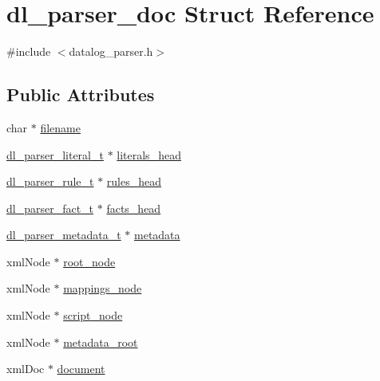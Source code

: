 \hypertarget{structdl__parser__doc}{}\section{dl\+\_\+parser\+\_\+doc Struct Reference}
\label{structdl__parser__doc}


{\ttfamily \#include $<$datalog\+\_\+parser.\+h$>$}

\subsection*{Public Attributes}
\begin{DoxyCompactItemize}
\item 
char $\ast$ \hyperlink{structdl__parser__doc_a723ad524e546b52a5b73a4bb6ea43f53}{filename}
\item 
\hyperlink{datalog__parser_8h_adaef2eede58b9f7698925f7194af1373}{dl\+\_\+parser\+\_\+literal\+\_\+t} $\ast$ \hyperlink{structdl__parser__doc_a85697af981ba61663c7c8e322f596de9}{literals\+\_\+head}
\item 
\hyperlink{datalog__parser_8h_a8024697b9e41c6c143acefaaf5d047cd}{dl\+\_\+parser\+\_\+rule\+\_\+t} $\ast$ \hyperlink{structdl__parser__doc_a46ff67ec42f4b114c00fc804296bf1aa}{rules\+\_\+head}
\item 
\hyperlink{datalog__parser_8h_ad97776994371341952d410f045d73e72}{dl\+\_\+parser\+\_\+fact\+\_\+t} $\ast$ \hyperlink{structdl__parser__doc_a6461d9de58fd2f3404680ca1d7e960f1}{facts\+\_\+head}
\item 
\hyperlink{datalog__parser_8h_a736cfacf590c4edd0dde10dd9c0880a1}{dl\+\_\+parser\+\_\+metadata\+\_\+t} $\ast$ \hyperlink{structdl__parser__doc_aed7768f7af6c53d24b4110b8163c8c27}{metadata}
\item 
xml\+Node $\ast$ \hyperlink{structdl__parser__doc_a66e2772a6557aafd00370ecad3a6b428}{root\+\_\+node}
\item 
xml\+Node $\ast$ \hyperlink{structdl__parser__doc_ab22e9a4005d93564188d786b878786dd}{mappings\+\_\+node}
\item 
xml\+Node $\ast$ \hyperlink{structdl__parser__doc_a9b8a86089333b4dd2d50bbcb5e784562}{script\+\_\+node}
\item 
xml\+Node $\ast$ \hyperlink{structdl__parser__doc_a08c1f4a9ca83844d75f7caf2a74eec6d}{metadata\+\_\+root}
\item 
xml\+Doc $\ast$ \hyperlink{structdl__parser__doc_ae8457bf3e2bee4e2d6246c4e34a30169}{document}
\end{DoxyCompactItemize}


